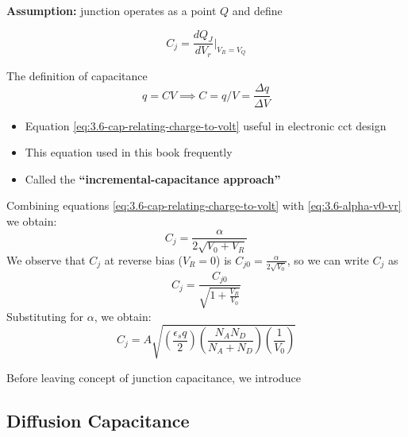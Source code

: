 \documentclass{report}
\begin{document}
\textbf{Assumption:} junction operates as a point $Q$ and define

\begin{equation}
	C_j = \frac{dQ_J}{dV_r} \bigg| _{V_R=V_Q}
	\label{eq:3.6-cap-relating-charge-to-volt}
\end{equation}
\begin{note}
	The definition of capacitance
	\begin{equation*}
		q = CV
		\implies C = q/V = \frac{\Delta q}{\Delta V}
	\end{equation*}
	\begin{itemize}
		\item Equation \ref{eq:3.6-cap-relating-charge-to-volt} useful in electronic cct design
		\item This equation used in this book frequently
		\item Called the \textbf{``incremental-capacitance approach''}
	\end{itemize}
\end{note}

Combining equations \ref{eq:3.6-cap-relating-charge-to-volt} with \ref{eq:3.6-alpha-v0-vr} we obtain:
\begin{equation}
	C_j = \frac{\alpha}{2\sqrt{V_0 + V_R}}
	\label{eq:3.6-derivative-Cj}
\end{equation}
We observe that $C_j$ at reverse bias ($V_R = 0$) is $C_{j0} = \frac{\alpha}{2\sqrt{V_0}}$, so we can write $C_j$ as
\begin{equation}
	C_j = \frac{C_{j0}}{\sqrt{1+\frac{V_R}{V_0}}}
	\label{eq:3.6-cj-wrt-cj0}
\end{equation}
Substituting for $\alpha$, we obtain:
\begin{equation}
	C_j = A \sqrt{\left(
		\frac{\epsilon_s q}{2}
	\right)\left(
		\frac{N_A N_D}{N_A + N_D}
	\right)\left(
		\frac{1}{V_0}
	\right)}
	\label{eq:3.6-cj-wrt-cj0-alpha-sub}
\end{equation}

Before leaving concept of junction capacitance, we introduce


\subsection{Diffusion Capacitance}
\end{document}
